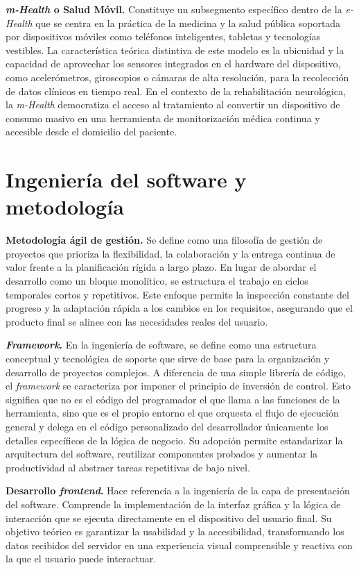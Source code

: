 \textbf{\textit{m-Health} o Salud Móvil.} Constituye un subsegmento específico dentro de la \textit{e-Health} que se centra en la práctica de la medicina y la salud pública soportada por dispositivos móviles como teléfonos inteligentes, tabletas y tecnologías vestibles. La característica teórica distintiva de este modelo es la ubicuidad y la capacidad de aprovechar los sensores integrados en el hardware del dispositivo, como acelerómetros, giroscopios o cámaras de alta resolución, para la recolección de datos clínicos en tiempo real. En el contexto de la rehabilitación neurológica, la \textit{m-Health} democratiza el acceso al tratamiento al convertir un dispositivo de consumo masivo en una herramienta de monitorización médica continua y accesible desde el domicilio del paciente.  \cite{wiki_mhealth}

\section{Ingeniería del software y metodología}

\textbf{Metodología ágil de gestión.} Se define como una filosofía de gestión de proyectos que prioriza la flexibilidad, la colaboración y la entrega continua de valor frente a la planificación rígida a largo plazo. En lugar de abordar el desarrollo como un bloque monolítico, se estructura el trabajo en ciclos temporales cortos y repetitivos. Este enfoque permite la inspección constante del progreso y la adaptación rápida a los cambios en los requisitos, asegurando que el producto final se alinee con las necesidades reales del usuario.

\textbf{\textit{Framework}.} En la ingeniería de software, se define como una estructura conceptual y tecnológica de soporte que sirve de base para la organización y desarrollo de proyectos complejos. A diferencia de una simple librería de código, el \textit{framework} se caracteriza por imponer el principio de inversión de control. Esto significa que no es el código del programador el que llama a las funciones de la herramienta, sino que es el propio entorno el que orquesta el flujo de ejecución general y delega en el código personalizado del desarrollador únicamente los detalles específicos de la lógica de negocio. Su adopción permite estandarizar la arquitectura del software, reutilizar componentes probados y aumentar la productividad al abstraer tareas repetitivas de bajo nivel.  \cite{unir_framework}

\textbf{Desarrollo \textit{frontend}.} Hace referencia a la ingeniería de la capa de presentación del software. Comprende la implementación de la interfaz gráfica y la lógica de interacción que se ejecuta directamente en el dispositivo del usuario final. Su objetivo teórico es garantizar la usabilidad y la accesibilidad, transformando los datos recibidos del servidor en una experiencia visual comprensible y reactiva con la que el usuario puede interactuar.

